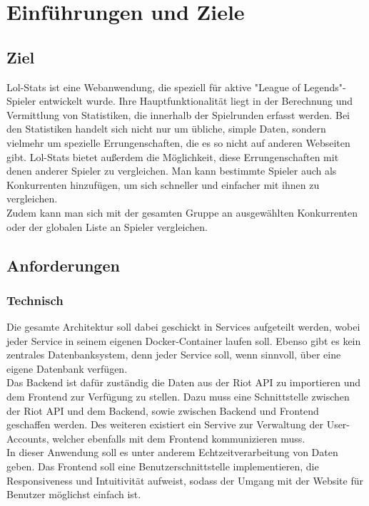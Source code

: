 \section{Einführungen und Ziele}
\subsection{Ziel}

Lol-Stats ist eine Webanwendung, die speziell für aktive "League of Legends"-Spieler entwickelt wurde. Ihre Hauptfunktionalität liegt in der Berechnung und Vermittlung
von Statistiken, die innerhalb der Spielrunden erfasst werden. Bei den Statistiken handelt sich nicht nur um übliche, simple Daten, sondern vielmehr um spezielle Errungenschaften, die es so nicht auf anderen Webseiten gibt. 
Lol-Stats bietet außerdem die Möglichkeit, diese Errungenschaften mit denen anderer Spieler zu vergleichen. Man kann bestimmte Spieler auch als Konkurrenten hinzufügen, um sich schneller und einfacher mit ihnen zu vergleichen.\\
Zudem kann man sich mit der gesamten Gruppe an ausgewählten Konkurrenten oder der globalen Liste an Spieler vergleichen.

\subsection{Anforderungen}

\subsubsection{Technisch}

Die gesamte Architektur soll dabei geschickt in Services aufgeteilt werden, wobei jeder Service in seinem eigenen Docker-Container laufen soll.
Ebenso gibt es kein zentrales Datenbanksystem, denn jeder Service soll, wenn sinnvoll, über eine eigene Datenbank verfügen.\\
Das Backend ist dafür zuständig die Daten aus der Riot API zu importieren und dem Frontend zur Verfügung zu stellen. Dazu muss eine Schnittstelle zwischen der Riot API und dem Backend, sowie zwischen Backend und Frontend geschaffen werden. Des weiteren existiert ein Servive zur Verwaltung der User-Accounts, welcher ebenfalls mit dem Frontend kommunizieren muss.\\
In dieser Anwendung soll es unter anderem Echtzeitverarbeitung von Daten geben. 
Das Frontend soll eine Benutzerschnittstelle implementieren, die Responsiveness und Intuitivität aufweist, sodass der Umgang mit der Website für Benutzer möglichst einfach ist.

